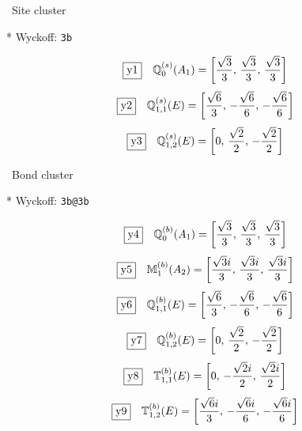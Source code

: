 \documentclass[fleqn,10pt,landscape]{jsarticle}
\begin{document}
\noindent\textbullet\, Site cluster

\vspace{5mm}

\noindent ** Wyckoff: \texttt{3b}

\begin{dmath*}
\fbox{y1}\quad \mathbb{Q}_{0}^{(s)}(A_{1})=\left[ \frac{\sqrt{3}}{3},\, \frac{\sqrt{3}}{3},\, \frac{\sqrt{3}}{3} \right]
\end{dmath*}
\begin{dmath*}
\fbox{y2}\quad \mathbb{Q}_{1,1}^{(s)}(E)=\left[ \frac{\sqrt{6}}{3},\, - \frac{\sqrt{6}}{6},\, - \frac{\sqrt{6}}{6} \right]
\end{dmath*}
\begin{dmath*}
\fbox{y3}\quad \mathbb{Q}_{1,2}^{(s)}(E)=\left[ 0,\, \frac{\sqrt{2}}{2},\, - \frac{\sqrt{2}}{2} \right]
\end{dmath*}
\vspace{5mm}

\noindent\textbullet\, Bond cluster

\vspace{5mm}

\noindent ** Wyckoff: \texttt{3b@3b}

\begin{dmath*}
\fbox{y4}\quad \mathbb{Q}_{0}^{(b)}(A_{1})=\left[ \frac{\sqrt{3}}{3},\, \frac{\sqrt{3}}{3},\, \frac{\sqrt{3}}{3} \right]
\end{dmath*}
\begin{dmath*}
\fbox{y5}\quad \mathbb{M}_{1}^{(b)}(A_{2})=\left[ \frac{\sqrt{3} i}{3},\, \frac{\sqrt{3} i}{3},\, \frac{\sqrt{3} i}{3} \right]
\end{dmath*}
\begin{dmath*}
\fbox{y6}\quad \mathbb{Q}_{1,1}^{(b)}(E)=\left[ \frac{\sqrt{6}}{3},\, - \frac{\sqrt{6}}{6},\, - \frac{\sqrt{6}}{6} \right]
\end{dmath*}
\begin{dmath*}
\fbox{y7}\quad \mathbb{Q}_{1,2}^{(b)}(E)=\left[ 0,\, \frac{\sqrt{2}}{2},\, - \frac{\sqrt{2}}{2} \right]
\end{dmath*}
\begin{dmath*}
\fbox{y8}\quad \mathbb{T}_{1,1}^{(b)}(E)=\left[ 0,\, - \frac{\sqrt{2} i}{2},\, \frac{\sqrt{2} i}{2} \right]
\end{dmath*}
\begin{dmath*}
\fbox{y9}\quad \mathbb{T}_{1,2}^{(b)}(E)=\left[ \frac{\sqrt{6} i}{3},\, - \frac{\sqrt{6} i}{6},\, - \frac{\sqrt{6} i}{6} \right]
\end{dmath*}
\vspace{5mm}
\end{document}
